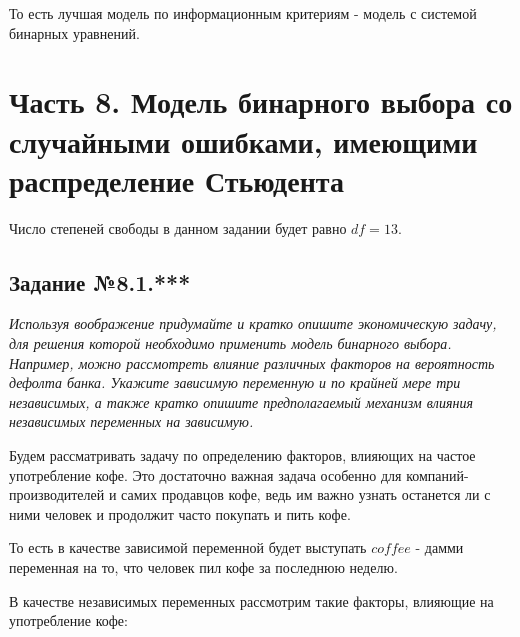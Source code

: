 \documentclass[a4paper,12pt]{article}
\begin{document}
	То есть лучшая модель по информационным критериям - модель с системой бинарных уравнений.

	\newpage

	\section{Часть 8. Модель бинарного выбора со случайными ошибками, имеющими распределение Стьюдента}
	
	Число степеней свободы в данном задании будет равно $df = 13$.
	
	\subsection{Задание №8.1.***}
	\textit{
	Используя воображение придумайте и кратко опишите экономическую задачу, для решения которой необходимо применить модель бинарного выбора. Например, можно рассмотреть влияние различных факторов на вероятность дефолта банка. Укажите зависимую переменную и по крайней мере три независимых, а также кратко опишите предполагаемый механизм влияния независимых переменных на зависимую. 
	}

	\vspace{0.2cm}

	Будем рассматривать задачу по определению факторов, влияющих на частое употребление кофе. Это достаточно важная задача особенно для компаний-производителей и самих продавцов кофе, ведь им важно узнать останется ли с ними человек и продолжит часто покупать и пить кофе.
	
	То есть в качестве зависимой переменной будет выступать $coffee$ - дамми переменная на то, что человек пил кофе за последнюю неделю.
	
	В качестве независимых переменных рассмотрим такие факторы, влияющие на употребление кофе:
	
\end{document}
